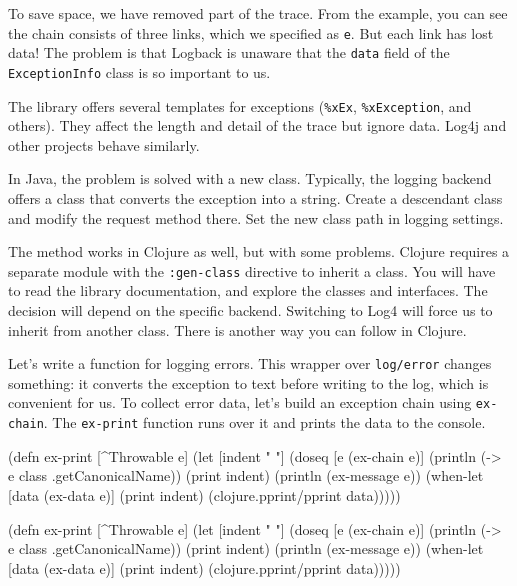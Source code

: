 \fi

To save space, we have removed part of the trace. From the example, you can see the chain consists of three links, which we specified as \verb|e|. But each link has lost data! The problem is that Logback is unaware that the \verb|data| field of the \verb|ExceptionInfo| class is so important to us.


The library offers several templates for exceptions (\verb|%xEx|, \verb|%xException|, and others). They affect the length and detail of the trace but ignore data. Log4j and other projects behave similarly.

In Java, the problem is solved with a new class. Typically, the logging backend offers a class that converts the exception into a string. Create a descendant class and modify the request method there. Set the new class path in logging settings.

The method works in Clojure as well, but with some problems. Clojure requires a separate module with the \verb|:gen-class| directive to inherit a class. You will have to read the library documentation, and explore the classes and interfaces. The decision will depend on the specific backend. Switching to Log4 will force us to inherit from another class. There is another way you can follow in Clojure.

Let's write a function for logging errors. This wrapper over \verb|log/error| changes something: it converts the exception to text before writing to the log, which is convenient for us. To collect error data, let's build an exception chain using \verb|ex-chain|. The \verb|ex-print| function runs over it and prints the data to the console.


\ifx\DEVICETYPE\MOBILE

\begin{clojure}
(defn ex-print
  [^Throwable e]
  (let [indent "  "]
    (doseq [e (ex-chain e)]
      (println (-> e
                   class
                   .getCanonicalName))
      (print indent)
      (println (ex-message e))
      (when-let [data (ex-data e)]
        (print indent)
        (clojure.pprint/pprint data)))))
\end{clojure}

\else

\begin{clojure}
(defn ex-print
  [^Throwable e]
  (let [indent "  "]
    (doseq [e (ex-chain e)]
      (println (-> e class .getCanonicalName))
      (print indent)
      (println (ex-message e))
      (when-let [data (ex-data e)]
        (print indent)
        (clojure.pprint/pprint data)))))
\end{clojure}

